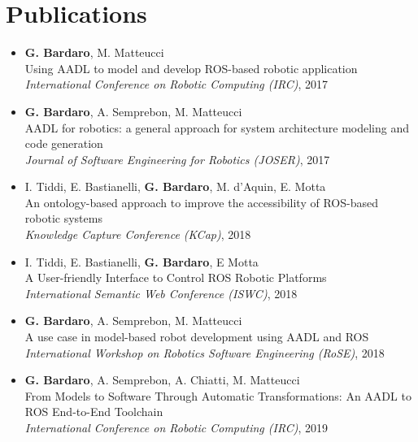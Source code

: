 \section{Publications}
\begin{itemize}
\item \textbf{G. Bardaro}, M. Matteucci \\
Using AADL to model and develop ROS-based robotic application~\cite{bardaro2017using} \\
\textit{International Conference on Robotic Computing (IRC)}, 2017
\item \textbf{G. Bardaro}, A. Semprebon, M. Matteucci \\
AADL for robotics: a general approach for system architecture modeling and code generation~\cite{bardaro2017aadl} \\
\textit{Journal of Software Engineering for Robotics (JOSER)}, 2017
\item I. Tiddi, E. Bastianelli, \textbf{G. Bardaro}, M. d'Aquin, E. Motta \\
An ontology-based approach to improve the accessibility of ROS-based robotic systems~\cite{tiddi2017ontology} \\
\textit{Knowledge Capture Conference (KCap)}, 2018 \\
\item I. Tiddi, E. Bastianelli, \textbf{G. Bardaro}, E Motta \\
A User-friendly Interface to Control ROS Robotic Platforms~\cite{tiddi2018user} \\
\textit{International Semantic Web Conference (ISWC)}, 2018
\item \textbf{G. Bardaro}, A. Semprebon, M. Matteucci \\
A use case in model-based robot development using AADL and ROS~\cite{bardaro2018use} \\
\textit{International Workshop on Robotics Software Engineering (RoSE)}, 2018
\item \textbf{G. Bardaro}, A. Semprebon, A. Chiatti, M. Matteucci \\
From Models to Software Through Automatic Transformations: An AADL to ROS End-to-End Toolchain~\cite{bardaro2019models} \\
\textit{International Conference on Robotic Computing (IRC)}, 2019
\end{itemize}

